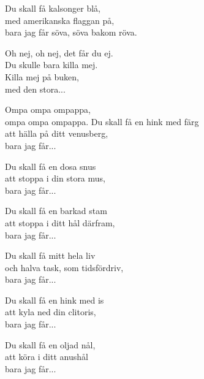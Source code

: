 \vspace{10pt}
Du skall få kalsonger blå,\\
med amerikanska flaggan på,\\
bara jag får söva, söva bakom röva. \par
\vspace{10pt}
Oh nej, oh nej, det får du ej.\\
Du skulle bara killa mej.\\
Killa mej på buken,\\
med den stora...\par
\vspace{10pt}
Ompa ompa ompappa,\\
ompa ompa ompappa.
\newpage
Du skall få en hink med färg\\
att hälla på ditt venusberg,\\
bara jag får...\par
\vspace{10pt}
Du skall få en dosa snus\\
att stoppa i din stora mus,\\
bara jag får...\par
\vspace{10pt}
Du skall få en barkad stam\\
att stoppa i ditt hål därfram,\\
bara jag får...\par
\vspace{10pt}
Du skall få mitt hela liv\\
och halva task, som tidsfördriv,\\
bara jag får...\par
\vspace{10pt}
Du skall få en hink med is\\
att kyla ned din clitoris,\\
bara jag får...\par
\vspace{10pt}
Du skall få en oljad nål,\\
att köra i ditt anushål\\
bara jag får...
